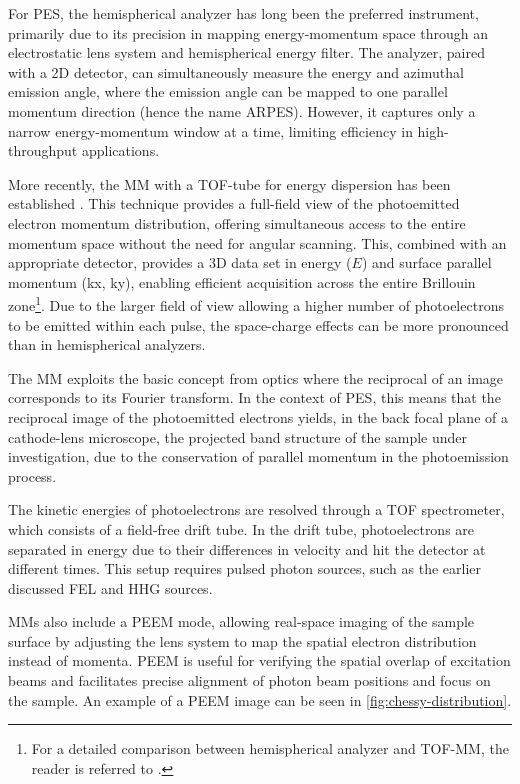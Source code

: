 For \gls{PES}, the hemispherical analyzer has long been the preferred instrument, primarily due to its precision in mapping energy-momentum space through an electrostatic lens system and hemispherical energy filter. The analyzer, paired with a 2D detector, can simultaneously measure the energy and azimuthal emission angle, where the emission angle can be mapped to one parallel momentum direction (hence the name \gls{ARPES}). However, it captures only a narrow energy-momentum window at a time, limiting efficiency in high-throughput applications.

More recently, the \gls{MM} with a \gls{TOF}-tube for energy dispersion has been established \cite{schonhenseSpaceTimeSpinresolved2015}. This technique provides a full-field view of the photoemitted electron momentum distribution, offering simultaneous access to the entire momentum space without the need for angular scanning. This, combined with an appropriate detector, provides a 3D data set in energy ($E$) and surface parallel momentum (\gls{kx}, \gls{ky}), enabling efficient acquisition across the entire Brillouin zone\footnote{For a detailed comparison between hemispherical analyzer and \gls{TOF}-\gls{MM}, the reader is referred to \cite{maklarQuantitativeComparisonTimeflight2020}.}. Due to the larger field of view allowing a higher number of photoelectrons to be emitted within each pulse, the space-charge effects can be more pronounced than in hemispherical analyzers.

The \gls{MM} exploits the basic concept from optics where the reciprocal of an image corresponds to its Fourier transform. In the context of \gls{PES}, this means that the reciprocal image of the photoemitted electrons yields, in the back focal plane of a cathode-lens microscope, the projected band structure of the sample under investigation, due to the conservation of parallel momentum in the photoemission process.

The kinetic energies of photoelectrons are resolved through a TOF spectrometer, which consists of a field-free drift tube. In the drift tube, photoelectrons are separated in energy due to their differences in velocity and hit the detector at different times. This setup requires pulsed photon sources, such as the earlier discussed \gls{FEL} and \gls{HHG} sources.

\Glspl{MM} also include a \gls{PEEM} mode, allowing real-space imaging of the sample surface by adjusting the lens system to map the spatial electron distribution instead of momenta. \gls{PEEM} is useful for verifying the spatial overlap of excitation beams and facilitates precise alignment of photon beam positions and focus on the sample. An example of a \gls{PEEM} image can be seen in \cref{fig:chessy-distribution}.

